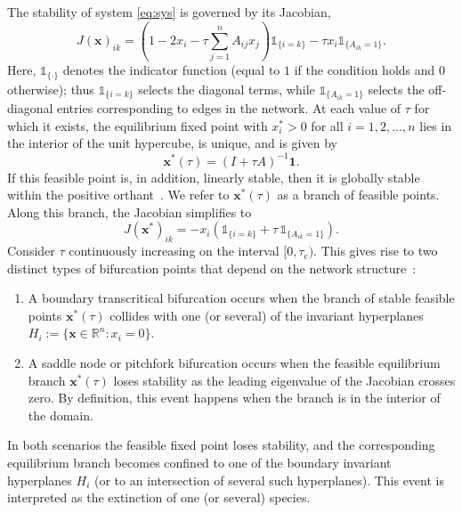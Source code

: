 \documentclass[a4paper,12pt]{article}
\begin{document}
The stability of system \eqref{eq:sys} is governed by its Jacobian,
\begin{equation}
    J(\mathbf{x})_{ik} = \left( 1 - 2 x_i - \tau \sum_{j=1}^n A_{ij} x_j \right) \mathds{1}_{\{ i = k \}} - \tau x_i \mathds{1}_{\{ A_{ik} = 1 \}}.
\end{equation}
Here, $\mathds{1}_{\{\cdot\}}$ denotes the indicator function (equal to $1$ if the condition holds and $0$ otherwise); thus $\mathds{1}_{\{ i = k \}}$ selects the diagonal terms, while $\mathds{1}_{\{ A_{ik} = 1 \}}$ selects the off-diagonal entries corresponding to edges in the network. At each value of $\tau$ for which it exists, the equilibrium fixed point with $x_i^* > 0$ for all $i = 1,2,\dots,n$ lies in the interior of the unit hypercube, is unique, and is given by
\begin{equation}
    \mathbf{x^*}(\tau) = (I + \tau A)^{-1} \mathbf{1}.
\end{equation}
If this feasible point is, in addition, linearly stable, then it is globally stable within the positive orthant~\cite{goh1977}. We refer to $\mathbf{x^*}(\tau)$ as a branch of feasible points. Along this branch, the Jacobian simplifies to
\begin{equation}
    J(\mathbf{x^*})_{ik}
    = -x_i \left( \mathds{1}_{\{ i = k \}} + \tau\, \mathds{1}_{\{ A_{ik} = 1 \}} \right).
    \label{eq:jac}
\end{equation}
Consider $\tau$ continuously increasing on the interval $[0,\tau_{\text{c}})$.
This gives rise to two distinct types of bifurcation points that depend on the network structure~\cite{mooij2024stablecoexistenceindefinitelylarge}:
\begin{enumerate}[label=(\arabic*)]
    \item A boundary transcritical bifurcation occurs when the branch of stable feasible points $\mathbf{x^*}(\tau)$ collides with one (or several) of the invariant hyperplanes \(H_i := \{\mathbf{x} \in \mathbb{R}^n : x_i = 0\}\).  
    
    \item A saddle node or pitchfork bifurcation occurs
    when the feasible equilibrium branch $\mathbf{x^*}(\tau)$ loses stability as the leading eigenvalue of the Jacobian crosses zero. By definition, this event happens when the branch is in the interior of the domain.
\end{enumerate}
 In both scenarios the feasible fixed point loses stability, and the corresponding equilibrium branch becomes confined to one of the boundary invariant hyperplanes $H_i$ (or to an intersection of several such hyperplanes).
This event is interpreted as the extinction of one (or several) species.
\end{document}
